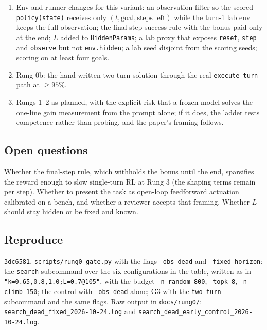 \documentclass[11pt,a4paper]{article}
\newcommand{\commit}[1]{\texttt{\textcolor{commitgray}{#1}}}
\begin{document}
\begin{enumerate}[nosep]
\item Env and runner changes for this variant: an observation filter so the
  scored \texttt{policy(state)} receives only $(t, \text{goal},
  \text{steps\_left})$ while the turn-1 lab env keeps the full observation; the
  final-step success rule with the bonus paid only at the end; $L$ added to
  \texttt{HiddenParams}; a lab proxy that exposes \texttt{reset}, \texttt{step}
  and \texttt{observe} but not \texttt{env.hidden}; a lab seed disjoint from
  the scoring seeds; scoring on at least four goals.
\item Rung 0b: the hand-written two-turn solution through the real
  \texttt{execute\_turn} path at $\geq 95\%$.
\item Rungs 1--2 as planned, with the explicit risk that a frozen model solves
  the one-line gain measurement from the prompt alone; if it does, the ladder
  tests competence rather than probing, and the paper's framing follows.
\end{enumerate}

\subsection*{Open questions}

Whether the final-step rule, which withholds the bonus until the end,
sparsifies the reward enough to slow single-turn RL at Rung 3 (the shaping
terms remain per step). Whether to present the task as open-loop feedforward
actuation calibrated on a bench, and whether a reviewer accepts that
framing. Whether $L$ should stay hidden or be fixed and known.

\subsection*{Reproduce}

\commit{3dc6581}, \texttt{scripts/rung0\_gate.py} with the flags
\texttt{--obs dead} and \texttt{--fixed-horizon}: the \texttt{search}
subcommand over the six configurations in the table, written as in
\texttt{"k=0.65,0.8,1.0;L=0.7@105"}, with the budget \texttt{--n-random 800},
\texttt{--topk 8}, \texttt{--n-climb 150}; the control with \texttt{--obs dead}
alone; G3 with the \texttt{two-turn} subcommand and the same flags. Raw
output in \texttt{docs/rung0/}: \texttt{search\_dead\_fixed\_2026-10-24.log}
and \texttt{search\_dead\_early\_control\_2026-10-24.log}.


\end{document}
